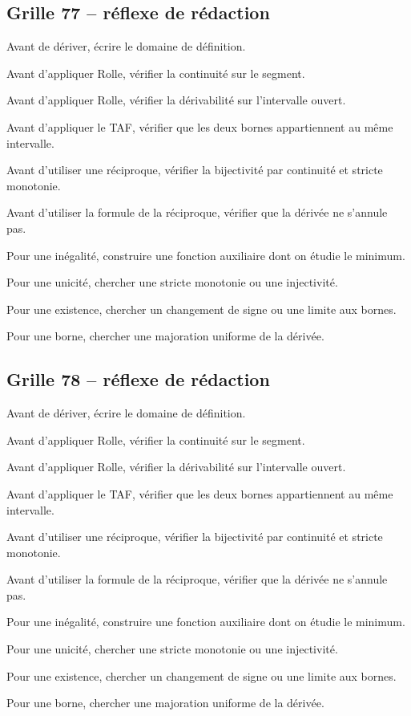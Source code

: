 \documentclass[11pt,a4paper]{article}
\begin{document}
\subsection*{Grille 77 -- réflexe de rédaction}

\begin{methodebox}

Avant de dériver, écrire le domaine de définition.

Avant d'appliquer Rolle, vérifier la continuité sur le segment.

Avant d'appliquer Rolle, vérifier la dérivabilité sur l'intervalle ouvert.

Avant d'appliquer le TAF, vérifier que les deux bornes appartiennent au même intervalle.

Avant d'utiliser une réciproque, vérifier la bijectivité par continuité et stricte monotonie.

Avant d'utiliser la formule de la réciproque, vérifier que la dérivée ne s'annule pas.

Pour une inégalité, construire une fonction auxiliaire dont on étudie le minimum.

Pour une unicité, chercher une stricte monotonie ou une injectivité.

Pour une existence, chercher un changement de signe ou une limite aux bornes.

Pour une borne, chercher une majoration uniforme de la dérivée.

\end{methodebox}

\subsection*{Grille 78 -- réflexe de rédaction}

\begin{methodebox}

Avant de dériver, écrire le domaine de définition.

Avant d'appliquer Rolle, vérifier la continuité sur le segment.

Avant d'appliquer Rolle, vérifier la dérivabilité sur l'intervalle ouvert.

Avant d'appliquer le TAF, vérifier que les deux bornes appartiennent au même intervalle.

Avant d'utiliser une réciproque, vérifier la bijectivité par continuité et stricte monotonie.

Avant d'utiliser la formule de la réciproque, vérifier que la dérivée ne s'annule pas.

Pour une inégalité, construire une fonction auxiliaire dont on étudie le minimum.

Pour une unicité, chercher une stricte monotonie ou une injectivité.

Pour une existence, chercher un changement de signe ou une limite aux bornes.

Pour une borne, chercher une majoration uniforme de la dérivée.

\end{methodebox}
\end{document}
